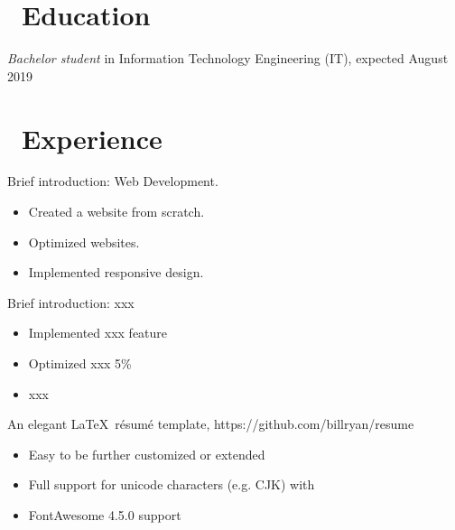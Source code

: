 \documentclass{resume}
\begin{document}



\section{\faGraduationCap\ Education}
\textit{Bachelor student} in Information Technology Engineering (IT), expected August 2019

\section{\faUsers\ Experience}
Brief introduction: Web Development.
\begin{itemize}
  \item Created a website from scratch.
  \item Optimized websites.
  \item Implemented responsive design.
\end{itemize}

Brief introduction: xxx
\begin{itemize}
  \item Implemented xxx feature
  \item Optimized xxx 5\%
  \item xxx
\end{itemize}

An elegant \LaTeX\ résumé template, https://github.com/billryan/resume
\begin{itemize}
  \item Easy to be further customized or extended
  \item Full support for unicode characters (e.g. CJK) with \XeLaTeX\
  \item FontAwesome 4.5.0 support
\end{itemize}
\end{document}
